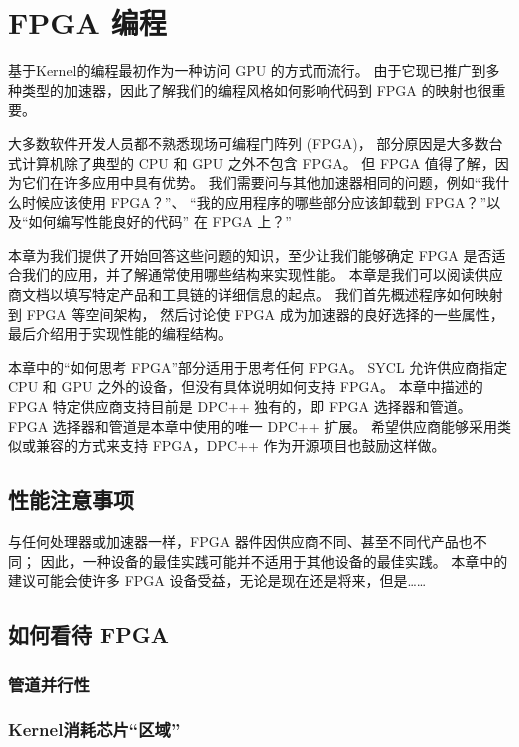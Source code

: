\section{FPGA 编程}

基于Kernel的编程最初作为一种访问 GPU 的方式而流行。 
由于它现已推广到多种类型的加速器，因此了解我们的编程风格如何影响代码到 FPGA 的映射也很重要。

大多数软件开发人员都不熟悉现场可编程门阵列 (FPGA)，
部分原因是大多数台式计算机除了典型的 CPU 和 GPU 之外不包含 FPGA。 
但 FPGA 值得了解，因为它们在许多应用中具有优势。 
我们需要问与其他加速器相同的问题，例如“我什么时候应该使用 FPGA？”、
“我的应用程序的哪些部分应该卸载到 FPGA？”以及“如何编写性能良好的代码” 在 FPGA 上？”

本章为我们提供了开始回答这些问题的知识，至少让我们能够确定 FPGA 是否适合我们的应用，并了解通常使用哪些结构来实现性能。 
本章是我们可以阅读供应商文档以填写特定产品和工具链的详细信息的起点。 
我们首先概述程序如何映射到 FPGA 等空间架构，
然后讨论使 FPGA 成为加速器的良好选择的一些属性，最后介绍用于实现性能的编程结构。

本章中的“如何思考 FPGA”部分适用于思考任何 FPGA。 
SYCL 允许供应商指定 CPU 和 GPU 之外的设备，但没有具体说明如何支持 FPGA。 
本章中描述的 FPGA 特定供应商支持目前是 DPC++ 独有的，即 FPGA 选择器和管道。 
FPGA 选择器和管道是本章中使用的唯一 DPC++ 扩展。 
希望供应商能够采用类似或兼容的方式来支持 FPGA，DPC++ 作为开源项目也鼓励这样做。

\subsection{性能注意事项}
与任何处理器或加速器一样，FPGA 器件因供应商不同、甚至不同代产品也不同； 
因此，一种设备的最佳实践可能并不适用于其他设备的最佳实践。 
本章中的建议可能会使许多 FPGA 设备受益，无论是现在还是将来，但是……

\subsection{如何看待 FPGA}

\subsubsection{管道并行性}

\subsubsection{Kernel消耗芯片“区域”}

